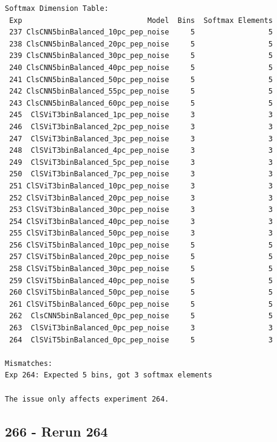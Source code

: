 \begin{verbatim}
Softmax Dimension Table:
 Exp                             Model  Bins  Softmax Elements
 237 ClsCNN5binBalanced_10pc_pep_noise     5                 5
 238 ClsCNN5binBalanced_20pc_pep_noise     5                 5
 239 ClsCNN5binBalanced_30pc_pep_noise     5                 5
 240 ClsCNN5binBalanced_40pc_pep_noise     5                 5
 241 ClsCNN5binBalanced_50pc_pep_noise     5                 5
 242 ClsCNN5binBalanced_55pc_pep_noise     5                 5
 243 ClsCNN5binBalanced_60pc_pep_noise     5                 5
 245  ClSViT3binBalanced_1pc_pep_noise     3                 3
 246  ClSViT3binBalanced_2pc_pep_noise     3                 3
 247  ClSViT3binBalanced_3pc_pep_noise     3                 3
 248  ClSViT3binBalanced_4pc_pep_noise     3                 3
 249  ClSViT3binBalanced_5pc_pep_noise     3                 3
 250  ClSViT3binBalanced_7pc_pep_noise     3                 3
 251 ClSViT3binBalanced_10pc_pep_noise     3                 3
 252 ClSViT3binBalanced_20pc_pep_noise     3                 3
 253 ClSViT3binBalanced_30pc_pep_noise     3                 3
 254 ClSViT3binBalanced_40pc_pep_noise     3                 3
 255 ClSViT3binBalanced_50pc_pep_noise     3                 3
 256 ClSViT5binBalanced_10pc_pep_noise     5                 5
 257 ClSViT5binBalanced_20pc_pep_noise     5                 5
 258 ClSViT5binBalanced_30pc_pep_noise     5                 5
 259 ClSViT5binBalanced_40pc_pep_noise     5                 5
 260 ClSViT5binBalanced_50pc_pep_noise     5                 5
 261 ClSViT5binBalanced_60pc_pep_noise     5                 5
 262  ClsCNN5binBalanced_0pc_pep_noise     5                 5
 263  ClSViT3binBalanced_0pc_pep_noise     3                 3
 264  ClSViT5binBalanced_0pc_pep_noise     5                 3

Mismatches:
Exp 264: Expected 5 bins, got 3 softmax elements

The issue only affects experiment 264.
\end{verbatim}

\subsection{266 - Rerun 264}
\label{app_res:266}

